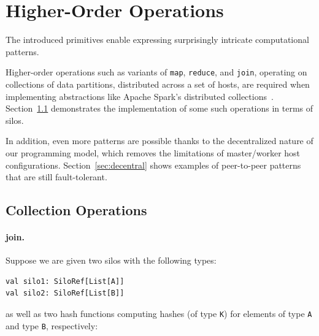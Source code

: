 \documentclass{jfp1}
\begin{document}
\section{Higher-Order Operations}
\label{sec:higher-order-operations}


The introduced primitives enable expressing surprisingly intricate computational
patterns.

Higher-order operations such as variants of \verb|map|, \verb|reduce|, and
\verb|join|, operating on collections of data partitions, distributed across a
set of hosts, are required when implementing abstractions like Apache Spark's
distributed collections~\cite{Spark}. Section~\ref{sec:dist-coll} demonstrates
the implementation of some such operations in terms of silos.

In addition, even more patterns are possible thanks to the decentralized nature
of our programming model, which removes the limitations of master/worker host
configurations. Section~\ref{sec:decentral} shows examples of peer-to-peer
patterns that are still fault-tolerant.


\subsection{Collection Operations}
\label{sec:dist-coll}

%

\paragraph{join.}

Suppose we are given two silos with the following types:

\begin{lstlisting}
val silo1: SiloRef[List[A]]
val silo2: SiloRef[List[B]]
\end{lstlisting}
\noindent
as well as two hash functions computing hashes (of type \verb|K|) for elements
of type \verb|A| and type \verb|B|, respectively:
\end{document}
